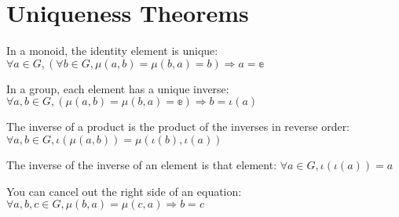 \section{Uniqueness Theorems}

\begin{theorem}
    \label{theorem : identity_uniqueness}
    \leanok
    In a monoid, the identity element is unique:
    $\forall a \in G, (\forall b \in G, \mu(a, b) = \mu(b, a) = b) \Rightarrow a = \mathbb{e}$
  \end{theorem}

\begin{theorem}
    \label{theorem : inverse_uniqueness}
    \leanok
    In a group, each element has a unique inverse:
    $\forall a, b \in G, (\mu(a, b) = \mu(b, a) = \mathbb{e}) \Rightarrow b = \iota(a)$
  \end{theorem}

\begin{theorem}
  \label{theorem : shoes_and_socks}
  \leanok
  The inverse of a product is the product of the inverses in reverse order:
  $\forall a, b \in G, \iota(\mu(a, b)) = \mu(\iota(b), \iota(a))$
\end{theorem}

\begin{theorem}
  \label{theorem : inv_inv}
  \leanok
  The inverse of the inverse of an element is that element:
  $\forall a \in G, \iota(\iota(a)) = a$
\end{theorem}

\begin{theorem}
  \label{definition : right_cancel}
  \leanok
  You can cancel out the right side of an equation:
  $\forall a, b, c \in G, \mu(b, a) = \mu(c, a) \Rightarrow b = c$
\end{theorem}
